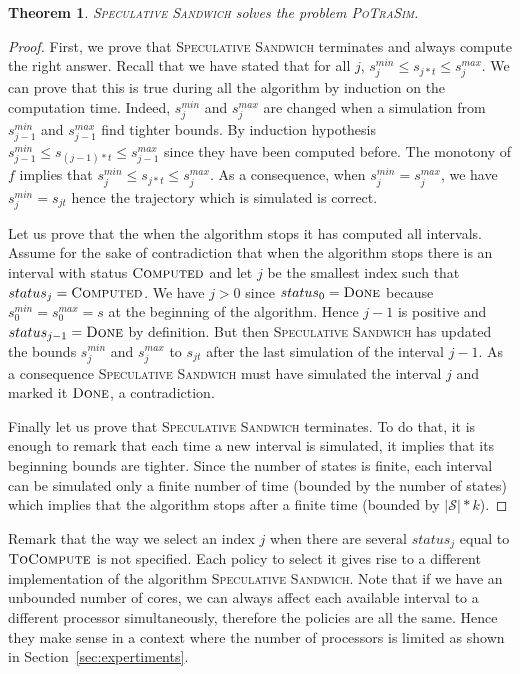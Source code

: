 \documentclass[a4paper,10pt]{article}
\newcommand{\cS}{\mathcal{S}}
\newtheorem{theorem}{Theorem}
\begin{document}
 
 \begin{theorem}\label{th:alg_ok}
  \textsc{Speculative Sandwich} solves the problem \textsc{PoTraSim}. 
  \end{theorem}
  
\begin{proof}
First, we prove that \textsc{Speculative Sandwich} terminates and always compute the right answer.
Recall that we have stated that for all $j$, $s_j^{min} \leq s_{j*t} \leq s_j^{max}$. We can prove that 
this is true during all the algorithm by induction on the computation time. Indeed, $s_j^{min}$ and $s_j^{max}$ are changed when a simulation from $s_{j-1}^{min}$ and $s_{j-1}^{max}$ find tighter bounds. By induction hypothesis $s_{j-1}^{min} \leq s_{(j-1)*t} \leq s_{j-1}^{max}$ since they have been computed before. The monotony of $f$ implies that $s_j^{min} \leq s_{j*t} \leq s_j^{max}$. As a consequence, when $s_j^{min} = s_j^{max}$, we have $s_j^{min} = s_{jt}$ hence the trajectory which is simulated is correct. 

Let us prove that the when the algorithm stops it has computed all intervals. Assume for the sake of contradiction that when the algorithm stops there is an interval with status $\textsc{Computed}$ and let 
$j$ be the smallest index such that $status_j = \textsc{Computed}$. We have $j>0$ since $status_0 = \textsc{Done}$ because $s_0^{min} = s_0^{max} = s$ at the beginning of the algorithm. Hence $j-1$ is positive and $status_{j-1} = \textsc{Done}$ by definition. But then \textsc{Speculative Sandwich} has updated the bounds $s_j^{min}$ and $s_j^{max}$ to $s_{jt}$ after the last simulation of the interval $j-1$. As a consequence \textsc{Speculative Sandwich} must have simulated the interval $j$ and marked it $\textsc{Done}$, a contradiction.

Finally let us prove that \textsc{Speculative Sandwich} terminates. 
To do that, it is enough to remark that each time a new interval is simulated,
it implies that its beginning bounds are tighter. Since the number of states is finite,
each interval can be simulated only a finite number of time (bounded by the number of states) which  implies 
that the algorithm stops after a finite time (bounded by $|\cS|*k$).
\end{proof}


Remark that the way we select an index $j$ when there are several $status_j$ equal to $\textsc{ToCompute}$ is not specified. Each policy to select it gives rise to a different implementation of the algorithm \textsc{Speculative Sandwich}. Note that if we have an unbounded number of cores, we can always affect each available interval to a different processor simultaneously, therefore the policies are all the same. Hence they make sense in a context where the number of processors is limited as shown in Section~\ref{sec:expertiments}.
\end{document}
